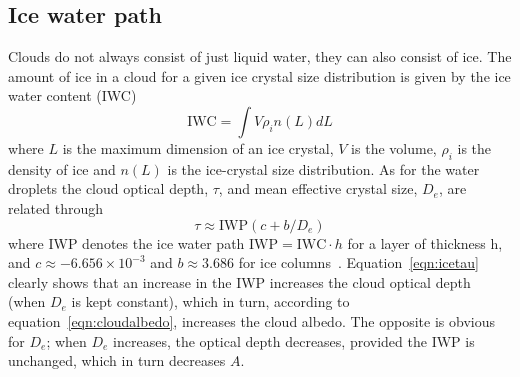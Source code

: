 \subsection{Ice water path}
 Clouds do not always consist of just liquid water, they can also consist of ice. The amount of ice in a cloud for a given ice crystal size distribution is given by the ice water content (IWC)~\cite{Liou2002}
\begin{equation}
\text{IWC} = \int V \rho_i n(L)dL
\end{equation}
where $L$ is the maximum dimension of an ice crystal, $V$ is the volume, $\rho_i$ is the density of ice and $n(L)$ is the ice-crystal size distribution. As for the water droplets the cloud optical depth, $\tau$, and mean effective crystal size, $D_e$, are related through
\begin{equation}
\tau \approx \text{IWP}(c + b/D_e)
\label{eqn:icetau}
\end{equation}
where IWP denotes the ice water path $\text{IWP} = \text{IWC} \cdot h$ for a layer of thickness h, and $c \approx -6.656 \times 10^{-3}$ and $b \approx 3.686$ for ice columns~\citep{Liou2002}. Equation~\ref{eqn:icetau} clearly shows that an increase in the IWP increases the cloud optical depth (when $D_e$ is kept constant), which in turn, according to equation~\ref{eqn:cloudalbedo}, increases the cloud albedo. The opposite is obvious for $D_e$; when $D_e$ increases, the optical depth decreases, provided the IWP is unchanged, which in turn decreases $A$.

